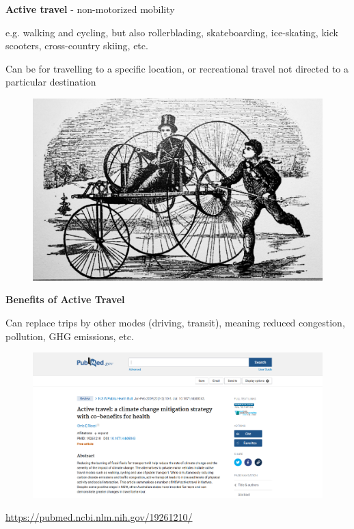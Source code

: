 \documentclass[aspectratio=169]{beamer}
\begin{document}
\begin{frame}
	
	\textbf{Active travel} - non-motorized mobility
	
	\vspace{2mm}
	
	e.g. walking and cycling, but also rollerblading, skateboarding, ice-skating, kick scooters, cross-country skiing, etc.
	
	\vspace{2mm}
	
	Can be for travelling to a specific location, or recreational travel not directed to a particular destination 

	\begin{figure}
		\centering
		\includegraphics[width=0.55\linewidth]{images/velocipede.jpg}
	\end{figure}
		
\end{frame}




\begin{frame}
	
	\textbf{Benefits of Active Travel}
	
	\vspace{4mm}
	
	Can replace trips by other modes (driving, transit), meaning reduced congestion, pollution, GHG emissions, etc.
	
	\begin{figure}
		\centering
		\includegraphics[width=0.7\linewidth]{images/active_travel_pollution.png}
	\end{figure}
	
	\tiny\url{https://pubmed.ncbi.nlm.nih.gov/19261210/}

\end{frame}
\end{document}
